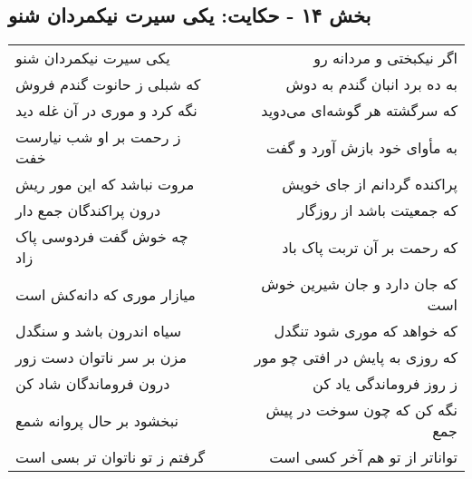 \begin{center}
\section*{بخش ۱۴ - حکایت: یکی سیرت نیکمردان شنو}
\label{sec:014}
\begin{longtable}{l p{0.5cm} r}
یکی سیرت نیکمردان شنو
&&
اگر نیکبختی و مردانه رو
\\
که شبلی ز حانوت گندم فروش
&&
به ده برد انبان گندم به دوش
\\
نگه کرد و موری در آن غله دید
&&
که سرگشته هر گوشه‌ای می‌دوید
\\
ز رحمت بر او شب نیارست خفت
&&
به مأوای خود بازش آورد و گفت
\\
مروت نباشد که این مور ریش
&&
پراکنده گردانم از جای خویش
\\
درون پراکندگان جمع دار
&&
که جمعیتت باشد از روزگار
\\
چه خوش گفت فردوسی پاک زاد
&&
که رحمت بر آن تربت پاک باد
\\
میازار موری که دانه‌کش است
&&
که جان دارد و جان شیرین خوش است
\\
سیاه اندرون باشد و سنگدل
&&
که خواهد که موری شود تنگدل
\\
مزن بر سر ناتوان دست زور
&&
که روزی به پایش در افتی چو مور
\\
درون فروماندگان شاد کن
&&
ز روز فروماندگی یاد کن
\\
نبخشود بر حال پروانه شمع
&&
نگه کن که چون سوخت در پیش جمع
\\
گرفتم ز تو ناتوان تر بسی است
&&
تواناتر از تو هم آخر کسی است
\\
\end{longtable}
\end{center}
